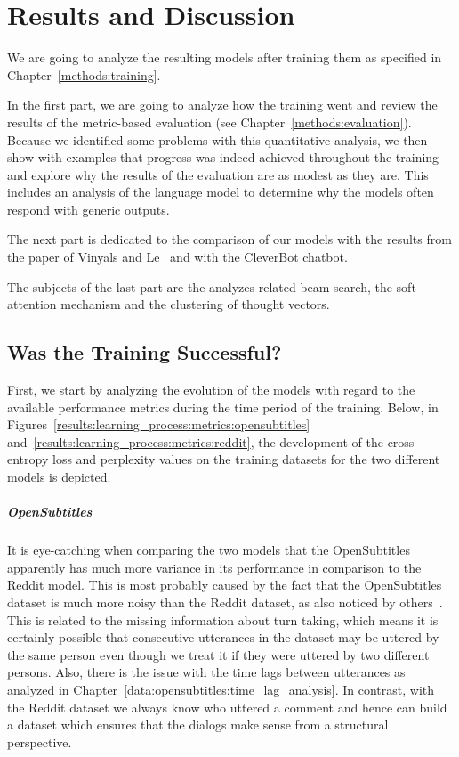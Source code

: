 \chapter{Results and Discussion}
\label{Results_and_Discussion}
We are going to analyze the resulting models after training them as specified in Chapter~\ref{methods:training}.

In the first part, we are going to analyze how the training went and review the results of the metric-based evaluation (see Chapter~\ref{methods:evaluation}). Because we identified some problems with this quantitative analysis, we then show with examples that progress was indeed achieved throughout the training and explore why the results of the evaluation are as modest as they are. This includes an analysis of the language model to determine why the models often respond with generic outputs.

The next part is dedicated to the comparison of our models with the results from the paper of Vinyals and Le~\cite{Vinyals:2015} and with the CleverBot chatbot.

The subjects of the last part are the analyzes related beam-search, the soft-attention mechanism and the clustering of thought vectors.

\section{Was the Training Successful?}
First, we start by analyzing the evolution of the models with regard to the available performance metrics during the time period of the training. Below, in Figures~\ref{results:learning_process:metrics:opensubtitles} and~\ref{results:learning_process:metrics:reddit}, the development of the cross-entropy loss and perplexity values on the training datasets for the two different models is depicted.

\paragraph{OpenSubtitles} It is eye-catching when comparing the two models that the OpenSubtitles apparently has much more variance in its performance in comparison to the Reddit model. This is most probably caused by the fact that the OpenSubtitles dataset is much more noisy than the Reddit dataset, as also noticed by others~\cite{Vinyals:2015}. This is related to the missing information about turn taking, which means it is certainly possible that consecutive utterances in the dataset may be uttered by the same person even though we treat it if they were uttered by two different persons. Also, there is the issue with the time lags between utterances as analyzed in Chapter~\ref{data:opensubtitles:time_lag_analysis}. In contrast, with the Reddit dataset we always know who uttered a comment and hence can build a dataset which ensures that the dialogs make sense from a structural perspective.

